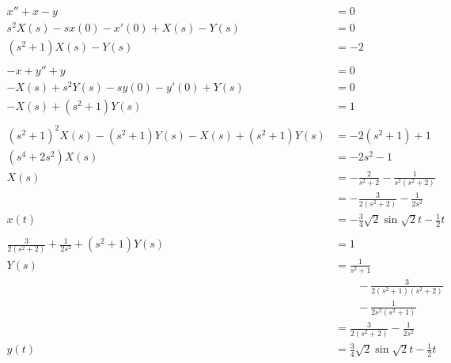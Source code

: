 \documentclass{article}
\begin{document}
\begin{align*}
  x'' + x - y                                               & = 0                                                     \\
  s^2 X(s) - s x(0) - x'(0) + X(s) - Y(s)                   & = 0                                                     \\
  (s^2 + 1) X(s) - Y(s)                                     & = -2                                                    \\ \\
  -x + y'' + y                                              & = 0                                                     \\
  -X(s) + s^2 Y(s) - s y(0) - y'(0) + Y(s)                  & = 0                                                     \\
  -X(s) + (s^2 + 1) Y(s)                                    & = 1                                                     \\ \\
  (s^2 + 1)^2 X(s) - (s^2 + 1) Y(s) - X(s) + (s^2 + 1) Y(s) & = -2 (s^2 + 1) + 1                                      \\
  (s^4 + 2 s^2) X(s)                                        & = -2 s^2 - 1                                            \\
  X(s)                                                      & = -\frac{2}{s^2 + 2} - \frac{1}{s^2 (s^2 + 2)}          \\
                                                            & = -\frac{3}{2 (s^2 + 2)} - \frac{1}{2 s^2}              \\
  x(t)                                                      & = -\frac{3}{4} \sqrt{2} \sin \sqrt{2} t - \frac{1}{2} t \\ \\
  \frac{3}{2 (s^2 + 2)} + \frac{1}{2 s^2} + (s^2 + 1) Y(s)  & = 1                                                     \\
  Y(s)                                                      & = \frac{1}{s^2 + 1}                                     \\
                                                            & \qquad - \frac{3}{2 (s^2 + 1) (s^2 + 2)}                \\
                                                            & \qquad - \frac{1}{2 s^2 (s^2 + 1)}                      \\
                                                            & = \frac{3}{2 (s^2 + 2)} - \frac{1}{2 s^2}               \\
  y(t)                                                      & = \frac{3}{4} \sqrt{2} \sin \sqrt{2} t - \frac{1}{2} t
\end{align*}
\end{document}
